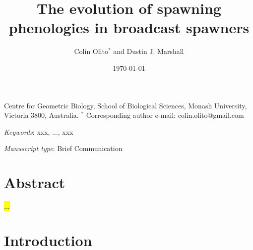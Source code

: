 \documentclass[11pt]{article}
\title{The evolution of spawning phenologies in broadcast spawners}
\author{Colin Olito$^{\ast}$ and Dustin J. Marshall}
\date{\today}
\begin{document}
\maketitle


\noindent{} Centre for Geometric Biology, School of Biological Sciences, Monash University, Victoria 3800, Australia.
\noindent{} $^\ast$ Corresponding author e-mail: colin.olito@gmail.com

\bigskip

\noindent{} \textit{Keywords}: xxx, ..., xxx

\bigskip

\noindent{} \textit{Manuscript type}: Brief Communication

\bigskip

\linenumbers
\modulolinenumbers[1]
\renewcommand\linenumberfont{\normalfont\small}


\newpage{}
\section*{Abstract}

\noindent{} \hl{...}

\section*{Introduction}
\end{document}
